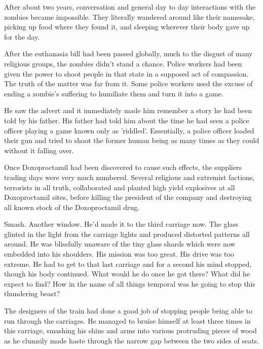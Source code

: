 After about two years, conversation and general day to day interactions with the zombies became impossible.  They literally wandered around like their namesake, picking up food where they found it, and sleeping wherever their body gave up for the day.

After the euthanasia bill had been passed globally, much to the disgust of many religious groups, the zombies didn't stand a chance.  Police workers had been given the power to shoot people in that state in a supposed act of compassion.  The truth of the matter was far from it.  Some police workers used the excuse of ending a zombie's suffering to humiliate them and turn it into a game.  

He saw the advert and it immediately made him remember a story he had been told by his father.  His father had told him about the time he had seen a police officer playing a game known only as 'riddled'.  Essentially, a police officer loaded their gun and tried to shoot the former human being as many times as they could without it falling over.  

Once Doxoproctamil had been discovered to cause such effects, the suppliers trading days were very much numbered.  Several religious and extremist factions, terrorists in all truth, collaborated and planted high yield explosives at all Doxoproctamil sites, before killing the president of the company and destroying all known stock of the Doxoproctamil drug.



\thoughtbreak



Smash.  Another window.  He'd made it to the third carriage now.  The glass glinted in the light from the carriage lights and produced distorted patterns all around.  He was blissfully unaware of the tiny glass shards which were now embedded into his shoulders.  His mission was too great.  His drive was too extreme.  He had to get to that last carriage and for a second his mind stopped, though his body continued.  What would he do once he got there?  What did he expect to find?  How in the name of all things temporal was he going to stop this thundering beast?  

The designers of the train had done a good job of stopping people being able to run through the carriages.  He managed to bruise himself at least three times in this carriage, smashing his shins and arms into various protruding pieces of wood as he clumsily made haste through the narrow gap between the two sides of seats.

